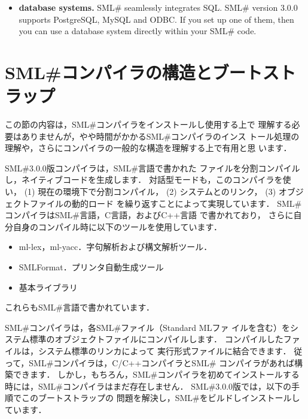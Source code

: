 \documentclass{jbook}
\newif\ifjp
\newcommand{\txt}[2]{#1}
\newcommand{\smlsharp}{SML\#}
\newcommand{\version}{3.0.0}
\begin{document}
\begin{itemize}
	If your purpose is to make a small program entirely within
\smlsharp{}, then you will not need to invoke a C compiler directly.
	However, if you want to make a paractical program, you may want to
call some system library functions or you may write some part of your
system in C and call that function from your ML code.
	This is straightforward in \smlsharp{}.
	To exploit this feature, we recommend that you familiarize
yourself with C compiler.

\item {\bf database systems.}
	\smlsharp{} seamlessly integrates SQL.
	\smlsharp{} version \version{} supports PostgreSQL, MySQL and ODBC.
	If you set up one of them, then you can use a database system
directly within your \smlsharp{} code.
\end{itemize}

\fi%


\section{
\txt{\smlsharp{}コンパイラの構造とブートストラップ}
    {Bootstrapping the \smlsharp{} compiler}
}
\label{sec:tutorialBootstrap}

\ifjp%
	この節の内容は，\smlsharp{}コンパイラをインストールし使用する上で
理解する必要はありませんが，やや時間がかかる\smlsharp{}コンパイラのインス
トール処理の理解や，さらにコンパイラの一般的な構造を理解する上で有用と思
います．

	\smlsharp{}\version{}版コンパイラは，\smlsharp{}言語で書かれた
ファイルを分割コンパイルし，ネイティブコードを生成します．
	対話型モードも，このコンパイラを使い，
(1) 現在の環境下で分割コンパイル，
(2) システムとのリンク，
(3) オブジェクトファイルの動的ロード
を繰り返すことによって実現しています．
	\smlsharp{}コンパイラは\smlsharp{}言語，C言語，およびC++言語
で書かれており，
さらに自分自身のコンパイル時に以下のツールを使用しています．
\begin{itemize}
\item ml-lex，ml-yacc．字句解析および構文解析ツール．
\item SMLFormat．プリンタ自動生成ツール
\item 基本ライブラリ
\end{itemize}
	これらも\smlsharp{}言語で書かれています．

	\smlsharp{}コンパイラは，各\smlsharp{}ファイル（Standard MLファ
イルを含む）をシステム標準のオブジェクトファイルにコンパイルします．
	コンパイルしたファイルは，システム標準のリンカによって
実行形式ファイルに結合できます．
	従って，\smlsharp{}コンパイラは，C/C++コンパイラと\smlsharp{}
コンパイラがあれば構築できます．
	しかし，もちろん，\smlsharp{}コンパイラを初めてインストールする
時には，\smlsharp{}コンパイラはまだ存在しません．
	\smlsharp{}\version{}版では，以下の手順でこのブートストラップの
問題を解決し，\smlsharp{}をビルドしインストールしています．
\end{document}
